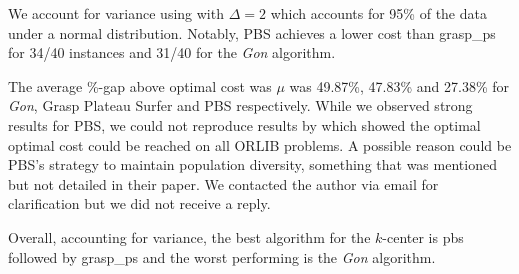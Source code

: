 We account for variance using  with $\Delta =2$ which accounts for 95\% of the data under a normal distribution. Notably, PBS achieves a lower cost than \acrshort{grasp_ps} for 34/40 instances and 31/40 for the \emph{Gon} algorithm. %

The average \%-gap above optimal cost was $\mu$ was 49.87\%, 47.83\% and 27.38\% for \emph{Gon}, Grasp Plateau Surfer and PBS respectively. While we observed strong results for PBS, we could not reproduce results by \textcite{pullan_memetic_2008} which showed the optimal optimal cost could be reached on all ORLIB problems. A possible reason could be PBS's strategy to maintain population diversity, something that was mentioned but not detailed in their paper. We contacted the author via email for clarification but we did not receive a reply.

Overall, accounting for variance, the best algorithm for the $k$-center is \acrshort{pbs} followed by \acrshort{grasp_ps} and the worst performing is the \emph{Gon} algorithm.